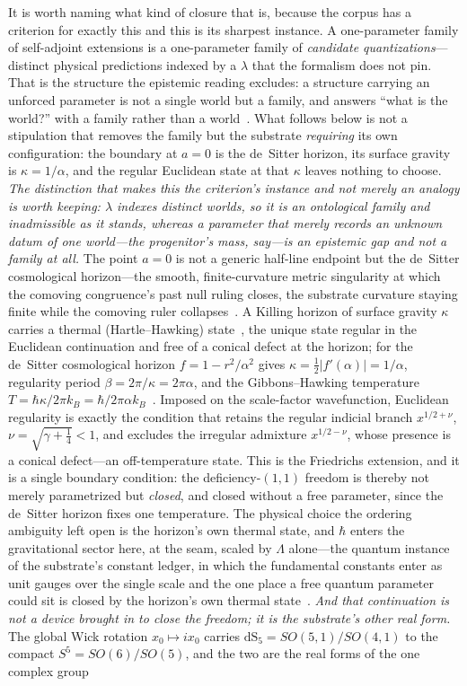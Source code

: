 \documentclass[11pt,a4paper]{article}
\theoremstyle{plain}
\theoremstyle{definition}
\theoremstyle{remark}
\begin{document}
It is worth naming what kind of closure that is, because the corpus has a criterion for exactly this and this is its sharpest instance. A one-parameter family of self-adjoint extensions is a one-parameter family of \emph{candidate quantizations}---distinct physical predictions indexed by a $\lambda$ that the formalism does not pin. That is the structure the epistemic reading excludes: a structure carrying an unforced parameter is not a single world but a family, and answers ``what is the world?'' with a family rather than a world~\cite{JanzenShadowExistence}. What follows below is not a stipulation that removes the family but the substrate \emph{requiring} its own configuration: the boundary at $a=0$ is the de~Sitter horizon, its surface gravity is $\kappa=1/\alpha$, and the regular Euclidean state at that $\kappa$ leaves nothing to choose. \emph{The distinction that makes this the criterion's instance and not merely an analogy is worth keeping: $\lambda$ indexes distinct worlds, so it is an ontological family and inadmissible as it stands, whereas a parameter that merely records an unknown datum of one world---the progenitor's mass, say---is an epistemic gap and not a family at all.} The point $a=0$ is not a generic half-line endpoint but the de~Sitter cosmological horizon---the smooth, finite-curvature metric singularity at which the comoving congruence's past null ruling closes, the substrate curvature staying finite while the comoving ruler collapses~\cite{JanzenBHcausality, JanzenOperator, JanzenCRframework}. A Killing horizon of surface gravity $\kappa$ carries a thermal (Hartle--Hawking) state~\cite{HartleHawking1976}, the unique state regular in the Euclidean continuation and free of a conical defect at the horizon; for the de~Sitter cosmological horizon $f=1-r^2/\alpha^2$ gives $\kappa=\tfrac12|f'(\alpha)|=1/\alpha$, regularity period $\beta=2\pi/\kappa=2\pi\alpha$, and the Gibbons--Hawking temperature $T=\hbar\kappa/2\pi k_B=\hbar/2\pi\alpha k_B$~\cite{GibbonsHawking1977}. Imposed on the scale-factor wavefunction, Euclidean regularity is exactly the condition that retains the regular indicial branch $x^{1/2+\nu}$, $\nu=\sqrt{\gamma+\tfrac14}<1$, and excludes the irregular admixture $x^{1/2-\nu}$, whose presence is a conical defect---an off-temperature state. This is the Friedrichs extension, and it is a single boundary condition: the deficiency-$(1,1)$ freedom is thereby not merely parametrized but \emph{closed}, and closed without a free parameter, since the de~Sitter horizon fixes one temperature. The physical choice the ordering ambiguity left open is the horizon's own thermal state, and $\hbar$ enters the gravitational sector here, at the seam, scaled by $\Lambda$ alone---the quantum instance of the substrate's constant ledger, in which the fundamental constants enter as unit gauges over the single scale and the one place a free quantum parameter could sit is closed by the horizon's own thermal state~\cite{JanzenGeometricCore}. \emph{And that continuation is not a device brought in to close the freedom; it is the substrate's other real form.} The global Wick rotation $x_{0}\mapsto ix_{0}$ carries $\mathrm{dS}_{5}=SO(5,1)/SO(4,1)$ to the compact $S^{5}=SO(6)/SO(5)$, and the two are the real forms of the one complex group 
\end{document}
